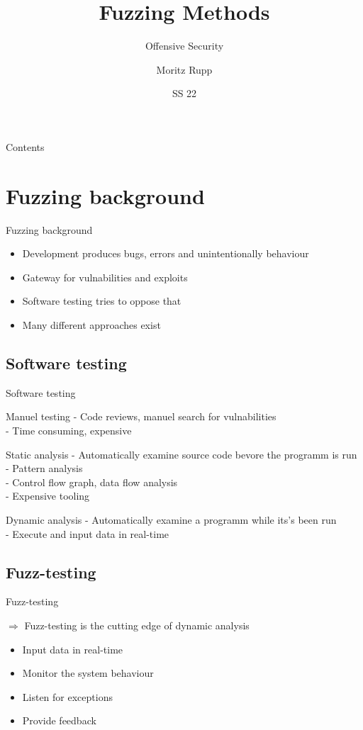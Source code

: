 \documentclass{beamer}
\title[Offensive Security]{Fuzzing Methods}
\subtitle{Offensive Security}
\author{Moritz Rupp}
\institute[MR]{Hochschule Albstadt-Sigmaringen}
\date{SS 22}
\begin{document}
\begin{frame}
 \titlepage
\end{frame}
\begin{frame}{Contents}
 \tableofcontents
\end{frame}
\section{Fuzzing background}
\begin{frame}{Fuzzing background}
\begin{itemize}
 \item Development produces bugs, errors and unintentionally behaviour
 \item Gateway for vulnabilities and exploits
 \item Software testing tries to oppose that
 \item Many different approaches exist
\end{itemize}
\end{frame}
\subsection{Software testing}
\begin{frame}{Software testing}
 \begin{block}{Manuel testing}
  - Code reviews, manuel search for vulnabilities\\
  - Time consuming, expensive
 \end{block}
\begin{block}{Static analysis}
- Automatically examine source code bevore the programm is run\\
- Pattern analysis \\
- Control flow graph, data flow analysis\\
- Expensive tooling
\end{block}
\begin{block}{Dynamic analysis}
- Automatically examine a programm while its's been run\\
- Execute and input data in real-time\\
\end{block}
\end{frame}
\subsection{Fuzz-testing}
\begin{frame}{Fuzz-testing}

  $\Rightarrow$ Fuzz-testing is the cutting edge of dynamic analysis
  
  \begin{itemize}
   \item Input data in real-time
   \item Monitor the system behaviour
   \item Listen for exceptions
   \item Provide feedback
  \end{itemize}

\end{frame}
\end{document}
